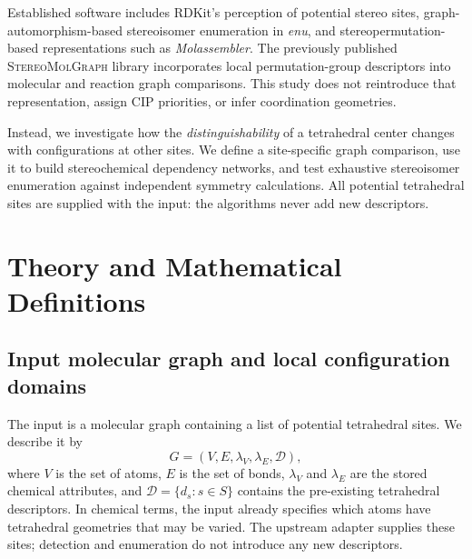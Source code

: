 \documentclass[journal=jcisd8,manuscript=article]{achemso}
\newcommand{\StereoMolGraph}{\textsc{StereoMolGraph}}
\begin{document}
Established software includes RDKit's perception of potential stereo
sites,\cite{RDKitBook2026} graph-automorphism-based stereoisomer
enumeration in \textit{enu},\cite{Rieder2023} and
stereopermutation-based representations such as
\textit{Molassembler}.\cite{Sobez2020}
The previously published \StereoMolGraph{} library incorporates
local permutation-group descriptors into molecular and reaction
graph comparisons.\cite{Papusha2026} This study does not
reintroduce that representation, assign CIP priorities, or infer
coordination geometries.

Instead, we investigate how the \emph{distinguishability} of a
tetrahedral center changes with configurations at other sites.
We define a site-specific graph comparison, use it to build
stereochemical dependency networks, and test exhaustive
stereoisomer enumeration against independent symmetry calculations.
All potential tetrahedral sites are supplied with the input:
the algorithms never add new descriptors.

\section{Theory and Mathematical Definitions}
\label{sec:theory}

\subsection{Input molecular graph and local configuration domains}
\label{subsec:input}

The input is a molecular graph containing a list of potential
tetrahedral sites. We describe it by
\begin{equation}
G=(V,E,\lambda_V,\lambda_E,\mathcal D),
\label{eq:graph}
\end{equation}
where $V$ is the set of atoms, $E$ is the set of bonds,
$\lambda_V$ and $\lambda_E$ are the stored chemical attributes,
and $\mathcal D=\{d_s:s\in S\}$ contains the pre-existing
tetrahedral descriptors. In chemical terms, the input already
specifies which atoms have tetrahedral geometries that may be
varied. The upstream adapter supplies these sites; detection
and enumeration do not introduce any new descriptors.
\end{document}

